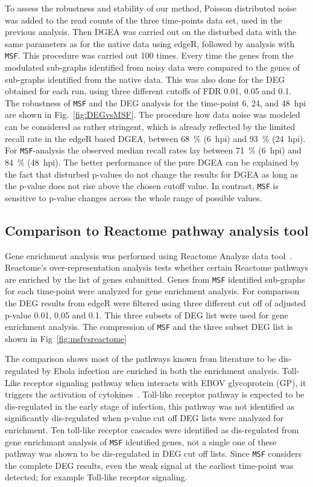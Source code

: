 \documentclass[10pt,a4paper,twocolumn]{article}
\begin{document}
 To assess the robustness and stability of our method, Poisson distributed
 noise was added to the read counts of the three time-points data set, used
 in the previous analysis. Then DGEA was carried out on the disturbed data
 with the same parameters as for the native data using edgeR, followed by
 analysis with \texttt{MSF}. This procedure was carried out 100 times.
 Every time the genes from the modulated sub-graphs identified from noisy
 data were compared to the genes of sub-graphs identified from the native
 data. This was also done for the DEG obtained for each run, using three different cutoffs of
 FDR 0.01, 0.05 and 0.1. The robustness of \texttt{MSF} and the DEG analysis
 for the time-point 6, 24, and 48~hpi are shown in
 Fig.~\ref{fig:DEGvsMSF}. The procedure how data noise was modeled can be
 considered as rather stringent, which is already reflected by the limited
 recall rate in the edgeR based DGEA, between 68~\% (6~hpi) and 93~\%
 (24~hpi). For \texttt{MSF}-analysis the observed median recall rates lay
 between 71~\% (6~hpi) and 84~\% (48~hpi). The better performance of the
 pure DGEA can be explained by the fact that disturbed p-values do not
 change the results for DGEA as long as the p-value does not rise above the
 chosen cutoff value. In contrast, \texttt{MSF} is sensitive to p-value
 changes across the whole range of possible values.


\subsection*{Comparison to Reactome pathway analysis tool}

Gene enrichment analysis was performed using Reactome Analyze data
tool~\cite{Reactome2}. Reactome's over-representation analysis tests whether
certain Reactome pathways are enriched by the list of genes submitted. Genes from \texttt{MSF} identified
sub-graphs for each time-point were analyzed for gene enrichment analysis.  For
comparison the DEG results from edgeR were filtered using three different cut off of
adjusted p-value 0.01, 0.05 and 0.1. This three subsets of DEG list were used for gene
enrichment analysis. The compression of \texttt{MSF}  and the three subset DEG list is shown in Fig~\ref{fig:msfvsreactome}

The comparison shows most of the pathways known from literature
to be dis-regulated by Ebola infection are enriched in both the enrichment
analysis. Toll-Like receptor signaling pathway when interacts with EBOV
glycoprotein (GP), it triggers the activation of
cytokines~\cite{Olejnik}. Toll-like receptor pathway is expected to be dis-regulated in the early stage of infection,  this pathway was not identified as significantly dis-regulated when p-value
cut off DEG lists were analyzed for enrichment. Ten toll-like receptor cascades were identified as dis-regulated from gene enrichmant analysis of \texttt{MSF} identified genes, not a single one of these pathway was shown to be dis-regulated in DEG cut off lists. Since \texttt{MSF}
considers the complete DEG results, even the weak signal at the earliest
time-point was detected; for example Toll-like receptor signaling.
\end{document}
